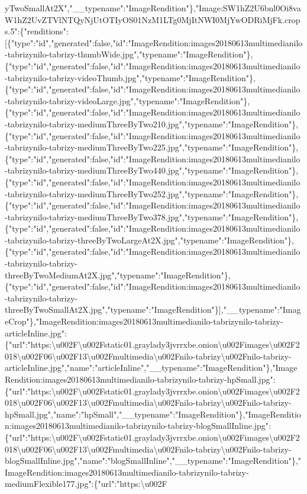 yTwoSmallAt2X","\_\_typename":"ImageRendition"\},"Image:SW1hZ2U6bnl0Oi8vaW1hZ2UvZTVlNTQyNjUtOTIyOS01NzM1LTg0MjItNWI0MjYwODRiMjFk.crops.5":\{"renditions":{[}\{"type":"id","generated":false,"id":"ImageRendition:images20180613multimedianilo-tabrizynilo-tabrizy-thumbWide.jpg","typename":"ImageRendition"\},\{"type":"id","generated":false,"id":"ImageRendition:images20180613multimedianilo-tabrizynilo-tabrizy-videoThumb.jpg","typename":"ImageRendition"\},\{"type":"id","generated":false,"id":"ImageRendition:images20180613multimedianilo-tabrizynilo-tabrizy-videoLarge.jpg","typename":"ImageRendition"\},\{"type":"id","generated":false,"id":"ImageRendition:images20180613multimedianilo-tabrizynilo-tabrizy-mediumThreeByTwo210.jpg","typename":"ImageRendition"\},\{"type":"id","generated":false,"id":"ImageRendition:images20180613multimedianilo-tabrizynilo-tabrizy-mediumThreeByTwo225.jpg","typename":"ImageRendition"\},\{"type":"id","generated":false,"id":"ImageRendition:images20180613multimedianilo-tabrizynilo-tabrizy-mediumThreeByTwo440.jpg","typename":"ImageRendition"\},\{"type":"id","generated":false,"id":"ImageRendition:images20180613multimedianilo-tabrizynilo-tabrizy-mediumThreeByTwo252.jpg","typename":"ImageRendition"\},\{"type":"id","generated":false,"id":"ImageRendition:images20180613multimedianilo-tabrizynilo-tabrizy-mediumThreeByTwo378.jpg","typename":"ImageRendition"\},\{"type":"id","generated":false,"id":"ImageRendition:images20180613multimedianilo-tabrizynilo-tabrizy-threeByTwoLargeAt2X.jpg","typename":"ImageRendition"\},\{"type":"id","generated":false,"id":"ImageRendition:images20180613multimedianilo-tabrizynilo-tabrizy-threeByTwoMediumAt2X.jpg","typename":"ImageRendition"\},\{"type":"id","generated":false,"id":"ImageRendition:images20180613multimedianilo-tabrizynilo-tabrizy-threeByTwoSmallAt2X.jpg","typename":"ImageRendition"\}{]},"\_\_typename":"ImageCrop"\},"ImageRendition:images20180613multimedianilo-tabrizynilo-tabrizy-articleInline.jpg":\{"url":"https:\textbackslash{}u002F\textbackslash{}u002Fstatic01.graylady3jvrrxbe.onion\textbackslash{}u002Fimages\textbackslash{}u002F2018\textbackslash{}u002F06\textbackslash{}u002F13\textbackslash{}u002Fmultimedia\textbackslash{}u002Fnilo-tabrizy\textbackslash{}u002Fnilo-tabrizy-articleInline.jpg","name":"articleInline","\_\_typename":"ImageRendition"\},"ImageRendition:images20180613multimedianilo-tabrizynilo-tabrizy-hpSmall.jpg":\{"url":"https:\textbackslash{}u002F\textbackslash{}u002Fstatic01.graylady3jvrrxbe.onion\textbackslash{}u002Fimages\textbackslash{}u002F2018\textbackslash{}u002F06\textbackslash{}u002F13\textbackslash{}u002Fmultimedia\textbackslash{}u002Fnilo-tabrizy\textbackslash{}u002Fnilo-tabrizy-hpSmall.jpg","name":"hpSmall","\_\_typename":"ImageRendition"\},"ImageRendition:images20180613multimedianilo-tabrizynilo-tabrizy-blogSmallInline.jpg":\{"url":"https:\textbackslash{}u002F\textbackslash{}u002Fstatic01.graylady3jvrrxbe.onion\textbackslash{}u002Fimages\textbackslash{}u002F2018\textbackslash{}u002F06\textbackslash{}u002F13\textbackslash{}u002Fmultimedia\textbackslash{}u002Fnilo-tabrizy\textbackslash{}u002Fnilo-tabrizy-blogSmallInline.jpg","name":"blogSmallInline","\_\_typename":"ImageRendition"\},"ImageRendition:images20180613multimedianilo-tabrizynilo-tabrizy-mediumFlexible177.jpg":\{"url":"https:\textbackslash{}u002F\tex